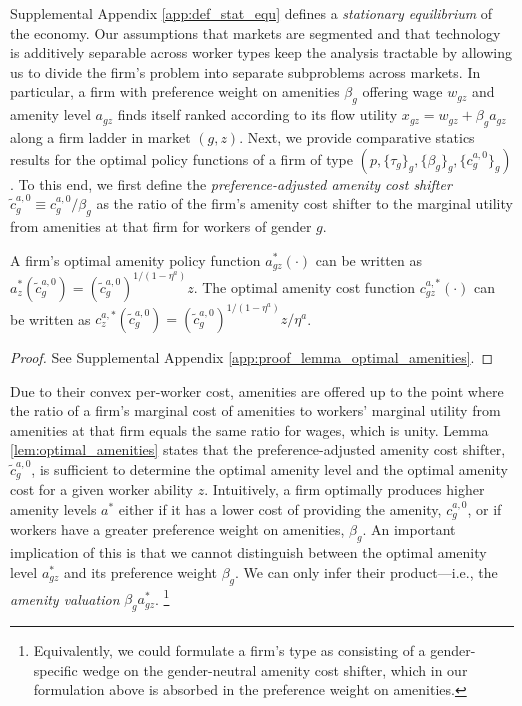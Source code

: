 Supplemental Appendix \ref{app:def_stat_equ} defines a \emph{stationary equilibrium} of the economy. Our assumptions that markets are segmented and that technology is additively separable across worker types keep the analysis tractable by allowing us to divide the firm's problem into separate subproblems across markets. In particular, a firm with preference weight on amenities $\beta_{g}$ offering wage $w_{gz}$ and amenity level $a_{gz}$ finds itself ranked according to its flow utility $x_{gz} = w_{gz} + \beta_{g} a_{gz}$ along a firm ladder in market $(g, z)$. Next, we provide comparative statics results for the optimal policy functions of a firm of type $(p, \{\tau_{g}\}_{g}, \{\beta_{g}\}_{g}, \{c_{g}^{a,0}\}_{g})$. To this end, we first define the \emph{preference-adjusted amenity cost shifter} $\tilde{c}_{g}^{a,0} \equiv c_{g}^{a,0} / \beta_{g}$ as the ratio of the firm's amenity cost shifter to the marginal utility from amenities at that firm for workers of gender $g$.
%
\newcommand{\LemmaOptimalAmenities}{%
    A firm's optimal amenity policy function $a_{gz}^{*}(\cdot)$ can be written as $a_{z}^{*}(\tilde{c}_{g}^{a,0}) = (\tilde{c}_{g}^{a,0})^{1/(1 - \eta^{a})} z$. The optimal amenity cost function $c_{gz}^{a,*}(\cdot)$ can be written as $c_{z}^{a,*}(\tilde{c}_{g}^{a,0}) = (\tilde{c}_{g}^{a,0})^{1/(1 - \eta^{a})} z/\eta^{a}$.%
}
%
\begin{lemma}
    \label{lem:optimal_amenities}
    \LemmaOptimalAmenities
\end{lemma}
%
\begin{proof}
    See Supplemental Appendix \ref{app:proof_lemma_optimal_amenities}.
\end{proof}
%
Due to their convex per-worker cost, amenities are offered up to the point where the ratio of a firm's marginal cost of amenities to workers' marginal utility from amenities at that firm equals the same ratio for wages, which is unity. Lemma \ref{lem:optimal_amenities} states that the preference-adjusted amenity cost shifter, $\tilde{c}_{g}^{a,0}$, is sufficient to determine the optimal amenity level and the optimal amenity cost for a given worker ability $z$. Intuitively, a firm optimally produces higher amenity levels $a^{*}$ either if it has a lower cost of providing the amenity, $c_{g}^{a,0}$, or if workers have a greater preference weight on amenities, $\beta_{g}$. An important implication of this is that we cannot distinguish between the optimal amenity level $a_{gz}^{*}$ and its preference weight $\beta_{g}$. We can only infer their product---i.e., the \emph{amenity valuation} $\beta_{g}a_{gz}^{*}$.%
%
\footnote{Equivalently, we could formulate a firm's type as consisting of a gender-specific wedge on the gender-neutral amenity cost shifter, which in our formulation above is absorbed in the preference weight on amenities.\label{revision_2:r2_comment_2b}} %
%


